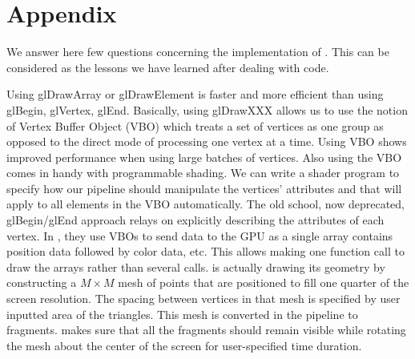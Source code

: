 \section*{Appendix}


We answer here few questions concerning the implementation of \protect{\wes}. This can be considered as the lessons we have learned after dealing with \protect{\wes} code.

Using glDrawArray or glDrawElement is faster and more efficient than using glBegin, glVertex, glEnd. Basically, using glDrawXXX allows us to use the notion of Vertex Buffer Object (VBO) which treats a set of vertices as one group as opposed to the direct mode of processing one vertex at a time. Using VBO shows improved performance when using large batches of vertices. Also using the VBO comes in handy with programmable shading. We can write a shader program to specify how our pipeline should manipulate the vertices’ attributes and that will apply to all elements in the VBO automatically. The old school, now deprecated, glBegin/glEnd approach relays on explicitly describing the attributes of each vertex. In \protect{\wes}, they use VBOs to send data to the GPU as a single array contains position data followed by color data, etc. This allows making one function call to draw the arrays rather than several calls.
\protect{\wes} is actually drawing its geometry by constructing a $M\times M$ mesh of points that are positioned to fill one quarter of the screen resolution. The spacing between vertices in that mesh is specified by user inputted area of the triangles. This mesh is converted in the pipeline to fragments. \protect{\wes} makes sure that all the fragments should remain visible while rotating the mesh about the center of the screen for user-specified time duration.

